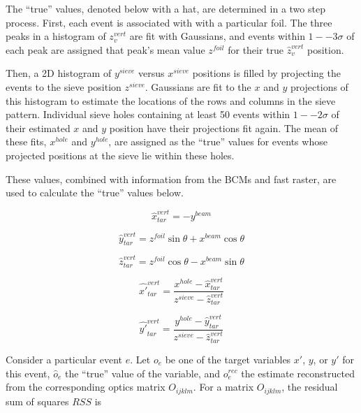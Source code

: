 The ``true'' values, denoted below with a hat, are determined in a two step
process.
First, each event is associated with with a particular foil.
The three peaks in a histogram of $z^{vert}_v$ are fit with Gaussians, and
events within $1--3\sigma$ of each peak are assigned that peak's mean value
$z^{foil}$ for their true $\hat{z}^{vert}_v$ position.


Then, a 2D histogram of $y^{sieve}$ versus $x^{sieve}$ positions is filled by
projecting the events to the sieve position $z^{sieve}$.
Gaussians are fit to the $x$ and $y$ projections of this histogram to estimate
the locations of the rows and columns in the sieve pattern.
Individual sieve holes containing at least 50 events within $1--2\sigma$ of
their estimated $x$ and $y$ position have their projections fit again.
The mean of these fits, $x^{hole}$ and $y^{hole}$, are assigned as the ``true''
values for events whose projected positions at the sieve lie within these
holes.


These values, combined with information from the BCMs and fast raster, are used
to calculate the ``true'' values below.

\begin{equation}
    \hat{x}_{tar}^{vert} = -y^{beam}
\end{equation}

\begin{equation}
    \hat{y}_{tar}^{vert} = z^{foil}\sin\theta + x^{beam} \cos\theta
\end{equation}

\begin{equation}
    \hat{z}_{tar}^{vert} = z^{foil}\cos\theta - x^{beam} \sin\theta
\end{equation}

\begin{equation}
    \hat{x'}_{tar}^{vert} = \frac{x^{hole}-\hat{x}_{tar}^{vert}}
                                 {z^{sieve}-\hat{z}_{tar}^{vert}}
\end{equation}

\begin{equation}
    \hat{y'}_{tar}^{vert} = \frac{y^{hole}-\hat{y}_{tar}^{vert}}
                                 {z^{sieve}-\hat{z}_{tar}^{vert}}
\end{equation}

Consider a particular event $e$.
Let $o_e$ be one of the target variables $x'$, $y$, or $y'$ for this event,
$\hat{o}_e$ the ``true'' value of the variable,
and
$o^{rec}_e$ the estimate reconstructed
from the corresponding optics matrix $O_{ijklm}$.
For a matrix $O_{ijklm}$, the residual sum of squares $RSS$ is

